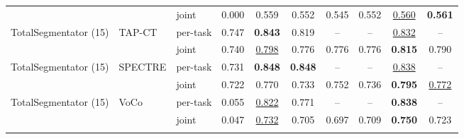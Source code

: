 \begin{tabular}{lllccccccc}
 &  & joint & 0.000 & 0.559 & \cellcolor{modebest}0.552 & 0.545 & \cellcolor{modebest}0.552 & \underline{0.560} & \cellcolor{modebest}\textbf{0.561} \\
\addlinespace[2pt]
TotalSegmentator (15) & TAP-CT & per-task & \cellcolor{modebest}0.747 & \cellcolor{modebest}\textbf{0.843} & \cellcolor{modebest}0.819 & -- & -- & \cellcolor{modebest}\underline{0.832} & -- \\
 &  & joint & 0.740 & \underline{0.798} & 0.776 & 0.776 & 0.776 & \textbf{0.815} & 0.790 \\
\addlinespace[2pt]
TotalSegmentator (15) & SPECTRE & per-task & \cellcolor{modebest}0.731 & \cellcolor{modebest}\textbf{0.848} & \cellcolor{modebest}\textbf{0.848} & -- & -- & \cellcolor{modebest}\underline{0.838} & -- \\
 &  & joint & 0.722 & 0.770 & 0.733 & 0.752 & 0.736 & \textbf{0.795} & \underline{0.772} \\
\addlinespace[2pt]
TotalSegmentator (15) & VoCo & per-task & \cellcolor{modebest}0.055 & \cellcolor{modebest}\underline{0.822} & \cellcolor{modebest}0.771 & -- & -- & \cellcolor{modebest}\textbf{0.838} & -- \\
 &  & joint & 0.047 & \underline{0.732} & 0.705 & 0.697 & 0.709 & \textbf{0.750} & 0.723 \\
\addlinespace[2pt]
\bottomrule
\end{tabular}
